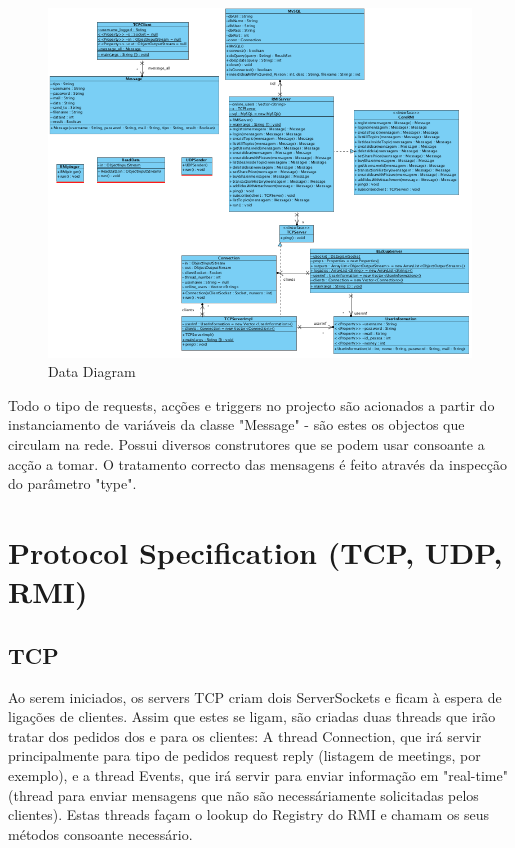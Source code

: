 \documentclass[12pt]{article} %
\begin{document}
\begin{figure}[!ht]
  	\centering
  	\includegraphics[scale=0.6]{ClassDiagram.png}
  	\caption{Data Diagram}
	\label{figure4}
\end{figure}

Todo o tipo de requests, acções e triggers no projecto são acionados a partir do instanciamento de variáveis da classe "Message" - são estes os objectos que circulam na rede. Possui diversos construtores que se podem usar consoante a acção a tomar. O tratamento correcto das mensagens é feito através da inspecção do parâmetro "type".





\section{Protocol Specification (TCP, UDP, RMI)} %
\label{sec:protocal_specs}

\subsection{TCP}

Ao serem iniciados, os servers TCP criam dois ServerSockets e ficam à espera de ligações de clientes. Assim que estes se ligam, são criadas duas threads que irão tratar dos pedidos dos e para os clientes: A thread Connection, que irá servir principalmente para tipo de pedidos request reply (listagem de meetings, por exemplo), e a thread Events, que irá servir para enviar informação em "real-time" (thread para enviar mensagens que não são necessáriamente solicitadas pelos clientes). Estas threads façam o lookup do Registry do RMI e chamam os seus métodos consoante necessário.
\end{document}
